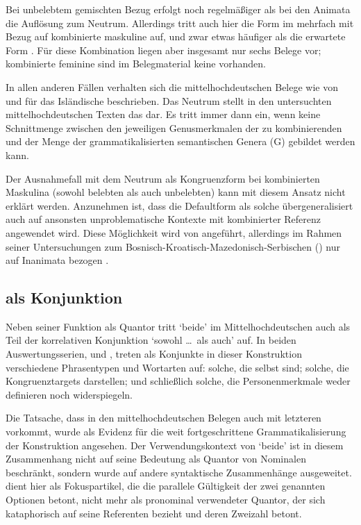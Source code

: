 Bei unbelebtem gemischten Bezug erfolgt noch regelmäßiger als bei den
Animata die Auflösung zum Neutrum. Allerdings tritt auch hier die
Form  im \CAO{} mehrfach mit Bezug auf kombinierte maskuline
 auf, und zwar etwas häufiger als die erwartete Form
. Für diese Kombination liegen aber insgesamt nur sechs Belege vor;
kombinierte feminine  sind im Belegmaterial keine vorhanden.

In allen anderen Fällen verhalten sich die
mittelhochdeutschen Belege wie von
\citet{wechslerzlatic2003} und \citet{wechsler2009} für das
Isländische beschrieben. Das Neutrum stellt in den untersuchten
mittelhochdeutschen Texten das  dar. Es tritt
immer dann ein, wenn keine Schnittmenge zwischen den jeweiligen Genusmerkmalen
der zu kombinierenden  und der Menge der grammatikalisierten
semantischen Genera (G) gebildet werden kann.

Der Ausnahmefall mit dem Neutrum als Kongruenzform bei
kombinierten Maskulina (sowohl belebten als auch unbelebten) kann
mit diesem Ansatz nicht erklärt werden. Anzunehmen ist, dass die
Defaultform als solche übergeneralisiert auch auf ansonsten
unproblematische Kontexte mit kombinierter Referenz angewendet wird. Diese
Möglichkeit wird von \citet[302]{corbett1991} angeführt, allerdings im Rahmen
seiner Untersuchungen zum
Bosnisch-\allowbreak{}Kroatisch-\allowbreak{}Mazedonisch-\allowbreak{}Serbischen
() nur auf Inanimata bezogen
\autocites[vgl.~auch][190]{wechslerzlatic2003}[581]{wechsler2009}.

\subsection{ als Konjunktion}

Neben seiner Funktion als Quantor tritt `beide' im
Mittelhochdeutschen auch als Teil der korrelativen
Konjunktion  `sowohl \dots\ als auch' auf. In beiden
Auswertungs\-serien, \CAO{} und \KC{}, treten als Konjunkte in dieser
Konstruktion verschiedene Phrasen\-typen und Wort\-arten auf: solche, die
selbst  sind; solche, die Kongruenztargets darstellen; und
schließlich solche, die Personenmerkmale weder definieren noch widerspiegeln.

Die Tatsache, dass  in den
mittelhochdeutschen Belegen auch mit letzteren vorkommt,
wurde als Evidenz für die weit fortgeschrittene Grammatikalisierung der
Konstruktion angesehen. Der Verwendungskontext von  `beide' ist in
diesem Zusammenhang nicht auf seine Bedeutung als Quantor von Nominalen
beschränkt, sondern wurde auf andere syntaktische Zusammenhänge ausgeweitet.
 dient hier als Fokuspartikel, die die parallele Gültigkeit der
zwei genannten Optionen betont, nicht mehr als pronominal verwendeter Quantor,
der sich kataphorisch auf seine Referenten bezieht und deren Zweizahl betont.


